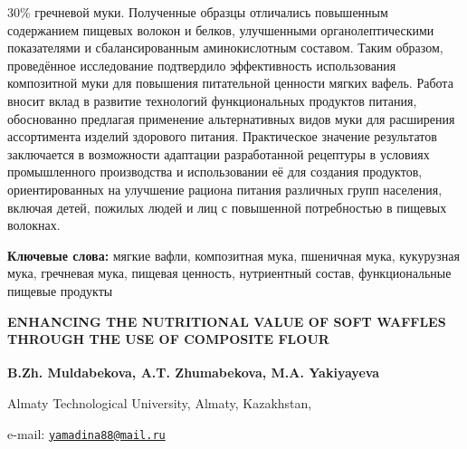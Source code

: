 30\% гречневой муки. Полученные образцы отличались повышенным
содержанием пищевых волокон и белков, улучшенными органолептическими
показателями и сбалансированным аминокислотным составом. Таким образом,
проведённое исследование подтвердило эффективность использования
композитной муки для повышения питательной ценности мягких вафель.
Работа вносит вклад в развитие технологий функциональных продуктов
питания, обоснованно предлагая применение альтернативных видов муки для
расширения ассортимента изделий здорового питания. Практическое значение
результатов заключается в возможности адаптации разработанной рецептуры
в условиях промышленного производства и использовании её для создания
продуктов, ориентированных на улучшение рациона питания различных групп
населения, включая детей, пожилых людей и лиц с повышенной потребностью
в пищевых волокнах.

{\bfseries Ключевые слова:} мягкие вафли, композитная мука, пшеничная мука,
кукурузная мука, гречневая мука, пищевая ценность, нутриентный состав,
функциональные пищевые продукты

{\bfseries ENHANCING THE NUTRITIONAL VALUE OF SOFT WAFFLES THROUGH THE USE
OF COMPOSITE FLOUR}

{\bfseries B.Zh. Muldabekova, A.T. Zhumabekova, M.A.
Yakiyayeva\textsuperscript{\envelope }}

Almaty Technological University, Almaty, Kazakhstan,

e-mail: \href{mailto:yamadina88@mail.ru}{\nolinkurl{yamadina88@mail.ru}}

